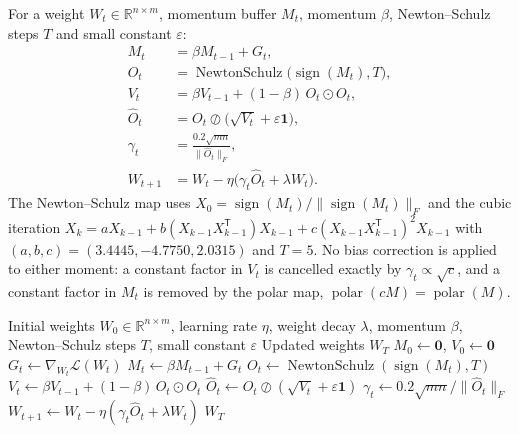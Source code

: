 For a weight $W_t \in \mathbb{R}^{n \times m}$, momentum buffer $M_t$, momentum $\beta$, Newton--Schulz steps $T$ and small constant $\varepsilon$:
\begin{align}
M_t &= \beta M_{t-1} + G_t, \\
O_t &= \operatorname{NewtonSchulz}\bigl(\operatorname{sign}(M_t), T\bigr), \\
V_t &= \beta V_{t-1} + (1-\beta)\, O_t \odot O_t, \\
\widehat{O}_t &= O_t \oslash \bigl(\sqrt{V_t} + \varepsilon \mathbf{1}\bigr), \\
\gamma_t &= \frac{0.2\sqrt{mn}}{\|\widehat{O}_t\|_F}, \\
W_{t+1} &= W_t - \eta\bigl(\gamma_t \widehat{O}_t + \lambda W_t\bigr).
\end{align}
The Newton--Schulz map uses $X_0 = \operatorname{sign}(M_t)/\|\operatorname{sign}(M_t)\|_F$ and the cubic iteration $X_k = aX_{k-1} + b(X_{k-1}X_{k-1}^{\mathsf T})X_{k-1} + c(X_{k-1}X_{k-1}^{\mathsf T})^2X_{k-1}$ with $(a,b,c) = (3.4445, -4.7750, 2.0315)$ and $T = 5$. No bias correction is applied to either moment: a constant factor in $V_t$ is cancelled exactly by $\gamma_t \propto \sqrt{c}$, and a constant factor in $M_t$ is removed by the polar map, $\operatorname{polar}(cM) = \operatorname{polar}(M)$.

\begin{algorithm}[H]
\caption{AdaMuon (Adaptive Muon)}
\label{alg:ada-muon}
\begin{algorithmic}[1]
\Require Initial weights $W_0 \in \mathbb{R}^{n \times m}$, learning rate $\eta$, weight decay $\lambda$, momentum $\beta$, Newton--Schulz steps $T$, small constant $\varepsilon$
\Ensure Updated weights $W_T$
\State $M_0 \gets \mathbf{0}$, $V_0 \gets \mathbf{0}$
    \State $G_t \gets \nabla_{W_t}\mathcal{L}(W_t)$
    \State $M_t \gets \beta M_{t-1} + G_t$
    \State $O_t \gets \operatorname{NewtonSchulz}(\operatorname{sign}(M_t), T)$
    \State $V_t \gets \beta V_{t-1} + (1-\beta)\, O_t \odot O_t$
    \State $\widehat{O}_t \gets O_t \oslash (\sqrt{V_t} + \varepsilon\mathbf{1})$
    \State $\gamma_t \gets 0.2\sqrt{mn}/\|\widehat{O}_t\|_F$
    \State $W_{t+1} \gets W_t - \eta(\gamma_t \widehat{O}_t + \lambda W_t)$
\EndFor
\Return $W_T$
\end{algorithmic}
\end{algorithm}

